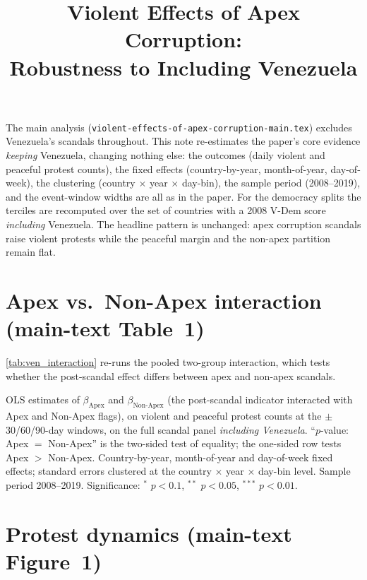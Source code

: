 \documentclass[11pt]{article}
\title{Violent Effects of Apex Corruption:\\[2pt] Robustness to Including Venezuela}
\author{}
\date{}
\begin{document}
\maketitle

The main analysis (\texttt{violent-effects-of-apex-corruption-main.tex}) excludes Venezuela's scandals throughout. This note re-estimates the paper's core evidence \emph{keeping} Venezuela, changing nothing else: the outcomes (daily violent and peaceful protest counts), the fixed effects (country-by-year, month-of-year, day-of-week), the clustering (country $\times$ year $\times$ day-bin), the sample period (2008--2019), and the event-window widths are all as in the paper. For the democracy splits the terciles are recomputed over the set of countries with a 2008 V-Dem score \emph{including} Venezuela. The headline pattern is unchanged: apex corruption scandals raise violent protests while the peaceful margin and the non-apex partition remain flat.

\section{Apex vs.\ Non-Apex interaction (main-text Table~1)}

\autoref{tab:ven_interaction} re-runs the pooled two-group interaction, which tests whether the post-scandal effect differs between apex and non-apex scandals.

\begin{table}[htb!]
    \caption{Apex vs.\ Non-Apex interaction, Venezuela included.}
    \label{tab:ven_interaction}
    \begin{center}\scriptsize{}\end{center}
    \footnotesize{OLS estimates of $\beta_{\text{Apex}}$ and $\beta_{\text{Non-Apex}}$ (the post-scandal indicator interacted with Apex and Non-Apex flags), on violent and peaceful protest counts at the $\pm$30/60/90-day windows, on the full scandal panel \emph{including Venezuela}. ``$p$-value: Apex $=$ Non-Apex'' is the two-sided test of equality; the one-sided row tests Apex $>$ Non-Apex. Country-by-year, month-of-year and day-of-week fixed effects; standard errors clustered at the country $\times$ year $\times$ day-bin level. Sample period 2008--2019. Significance: $^{*}$ $p<0.1$, $^{**}$ $p<0.05$, $^{***}$ $p<0.01$.}
\end{table}

\section{Protest dynamics (main-text Figure~1)}
\end{document}
